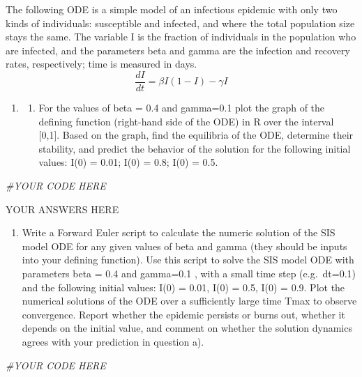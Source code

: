 \documentclass[
]{book}
\newenvironment{Shaded}{\begin{snugshade}}{\end{snugshade}}
\newcommand{\CommentTok}[1]{\textcolor[rgb]{0.56,0.35,0.01}{\textit{#1}}}
\providecommand{\tightlist}{%
  \setlength{\itemsep}{0pt}\setlength{\parskip}{0pt}}
\theoremstyle{definition}
\theoremstyle{definition}
\theoremstyle{definition}
\theoremstyle{remark}
\begin{document}
The following ODE is a simple model of an infectious epidemic with only two kinds of individuals: susceptible and infected, and where the total population size stays the same. The variable I is the fraction of individuals in the population who are infected, and the parameters beta and gamma are the infection and recovery rates, respectively; time is measured in days.
\[ \frac{dI}{dt} = \beta I(1-I) - \gamma I \]

\begin{enumerate}
\def\labelenumi{\arabic{enumi}.}
\item
  \begin{enumerate}
  \def\labelenumii{\alph{enumii})}
  \tightlist
  \item
    For the values of beta = 0.4 and gamma=0.1 plot the graph of the defining function (right-hand side of the ODE) in R over the interval {[}0,1{]}. Based on the graph, find the equilibria of the ODE, determine their stability, and predict the behavior of the solution for the following initial values: I(0) = 0.01; I(0) = 0.8; I(0) = 0.5.
  \end{enumerate}
\end{enumerate}

\begin{Shaded}
\begin{Highlighting}[]
\CommentTok{\#YOUR CODE HERE}
\end{Highlighting}
\end{Shaded}

YOUR ANSWERS HERE

\begin{enumerate}
\def\labelenumi{\alph{enumi})}
\setcounter{enumi}{1}
\tightlist
\item
  Write a Forward Euler script to calculate the numeric solution of the SIS model ODE for any given values of beta and gamma (they should be inputs into your defining function). Use this script to solve the SIS model ODE with parameters beta = 0.4 and gamma=0.1 , with a small time step (e.g.~dt=0.1) and the following initial values: I(0) = 0.01, I(0) = 0.5, I(0) = 0.9. Plot the numerical solutions of the ODE over a sufficiently large time Tmax to observe convergence. Report whether the epidemic persists or burns out, whether it depends on the initial value, and comment on whether the solution dynamics agrees with your prediction in question a).
\end{enumerate}

\begin{Shaded}
\begin{Highlighting}[]
\CommentTok{\#YOUR CODE HERE}
\end{Highlighting}
\end{Shaded}
\end{document}
